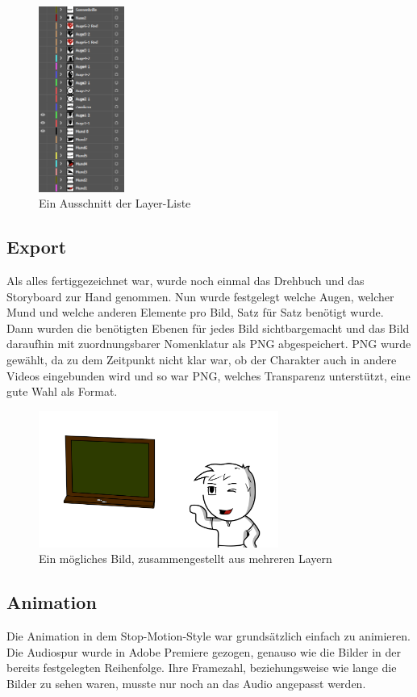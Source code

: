 \begin{figure}[H] 
  \centering
     \includegraphics[width=0.25\textwidth]{video_abb3.png}
  \caption{Ein Ausschnitt der Layer-Liste}
\end{figure}

\subsection{Export}
\renewcommand{\kapitelautor}{Autor: Niklas Kienreich}
Als alles fertiggezeichnet war, wurde noch einmal das Drehbuch und das Storyboard zur Hand genommen. Nun wurde festgelegt welche Augen, welcher Mund und welche anderen Elemente pro Bild, Satz für Satz benötigt wurde. Dann wurden die benötigten Ebenen für jedes Bild sichtbargemacht und das Bild daraufhin mit zuordnungsbarer Nomenklatur als PNG abgespeichert. PNG wurde gewählt, da zu dem Zeitpunkt nicht klar war, ob der Charakter auch in andere Videos eingebunden wird und so war PNG, welches Transparenz unterstützt, eine gute Wahl als Format.

\begin{figure}[H] 
  \centering
     \includegraphics[width=0.7\textwidth]{video_abb4.png}
  \caption{Ein mögliches Bild, zusammengestellt aus mehreren Layern}
\end{figure}

\subsection{Animation}
\renewcommand{\kapitelautor}{Autor: Niklas Kienreich}
Die Animation in dem Stop-Motion-Style war grundsätzlich einfach zu animieren. Die Audiospur wurde in Adobe Premiere gezogen, genauso wie die Bilder in der bereits festgelegten Reihenfolge. Ihre Framezahl, beziehungsweise wie lange die Bilder zu sehen waren, musste nur noch an das Audio angepasst werden.
\renewcommand{\kapitelautor}{Autor: Niklas Kienreich}